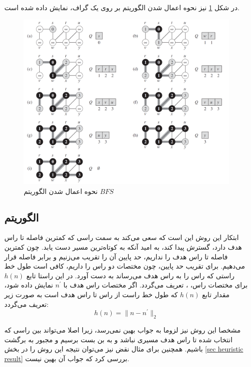  در شکل \ref{Fig BFS representation} نیز نحوه اعمال شدن الگوریتم  بر روی یک گراف، نمایش داده شده است.
\begin{figure}[!h]
	\centering
	\includegraphics[scale=0.4]{Images/BFS-representation.png}
	\caption{نحوه اعمال شدن الگوریتم $BFS$}\label{Fig BFS representation}
\end{figure}


\newpage
\subsection{الگوریتم }
ابتکار این روش این است که سعی می‌کند به سمت راسی که کمترین فاصله تا راس هدف دارد، گسترش پیدا کند، به امید آنکه به کوتاه‌ترین مسیر دست یابد. چون کمترین فاصله تا راس هدف را نداریم، حد پایین آن‌ را تقریب می‌زنیم و برابر فاصله قرار می‌دهیم. برای تقریب حد پایین، چون مختصات دو راس را داریم، کافی است طول خط راستی که راس را به راس هدف می‌رساند به دست آورد. در این راستا تابع $h(n)$ برای مختصات راس، ، تعریف می‌گردد. اگر مختصات راس هدف با $n^\prime$ نمایش داده شود، مقدار تابع $h(n)$ که طول خط راست از راس تا راس هدف است به صورت زیر تعریف می‌گردد:
\begin{equation}\label{eq heuristic h}
h(n) = \|n - n^\prime\|_2
\end{equation}

مشخصا این روش نیز لزوما به جواب بهین نمی‌رسد، زیرا اصلا می‌تواند بین راسی که انتخاب شده تا راس هدف مسیری نباشد و به بن بست برسیم و مجبور به برگشت باشیم. همچنین برای مثال نقض نیز می‌توان نتیجه این روش را در بخش \ref{sec heuristic result} بررسی کرد که جواب آن بهین نیست.

